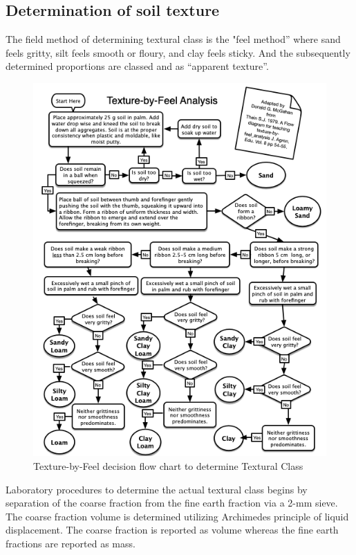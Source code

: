 \documentclass[a5paper]{book}
\begin{document}
\subsection{Determination of soil texture}

The field method of determining textural class is the "feel method” where sand feels gritty, silt feels smooth or floury, and clay feels sticky. And the subsequently determined proportions are classed and as “apparent texture”.

\begin{figure}
    \includegraphics[width=0.9\columnwidth]{images/TextureFlowChart.png}
    \caption{Texture-by-Feel decision flow chart to determine Textural Class}
    \label{fig:TextureByFeelFlowChart}
\end{figure}

Laboratory procedures to determine the actual textural class begins by separation of the coarse fraction from the fine earth fraction via a 2-mm sieve. The coarse fraction volume is determined utilizing Archimedes principle of liquid displacement. The coarse fraction is reported as volume whereas the fine earth fractions are reported as mass.
\end{document}
